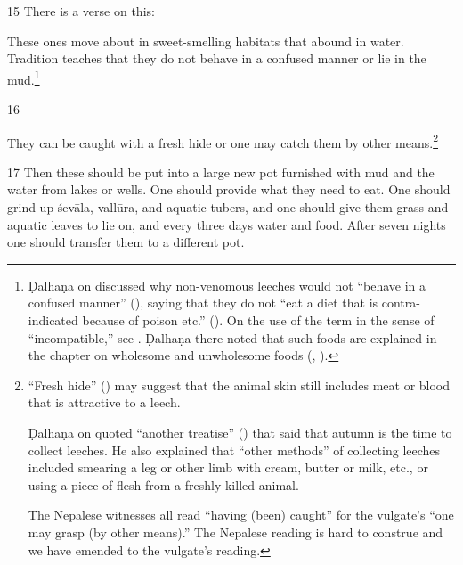 \begin{translation}
\item[15]
There is a verse on this:

\begin{sloka}
    These ones move about in sweet-smelling habitats that abound in water.
Tradition teaches that they do not behave in a confused manner or lie in the
mud.\footnote{Ḍalhaṇa on  discussed why non-venomous 
leeches
    would not “behave in a confused manner” (), saying that
    they do not “eat a diet that is contra-indicated because of poison etc.”
    ().  On the use of the term  in
    the sense of “incompatible,” see . Ḍalhaṇa there noted that
    such foods are explained in the chapter on wholesome and unwholesome 
    foods
    (, ).}
\end{sloka}

\item[16]

They can be caught with a fresh hide or one may catch them by other 
means.\footnote{“Fresh hide” () may suggest that the 
animal skin still 
includes
meat or blood that is attractive to a leech.

   Ḍalhaṇa on  quoted “another treatise”
() that said that autumn is the time to collect
leeches.  He also explained that “other methods” of collecting leeches
included smearing a leg or other limb with cream, butter or milk, etc.,
or using a piece of flesh from a freshly killed animal.

The Nepalese witnesses all read  “having (been)
caught” for the vulgate's  “one may grasp (by other means).” 
The Nepalese reading is hard to construe and we have emended to the 
vulgate's reading.}


\item [17] Then these should be put into a large new pot furnished with mud
and the water from lakes or wells. One should provide what they need to eat.
One should grind up \gls{śevāla}, \gls{vallūra}, and aquatic tubers, and one
should give them grass and aquatic leaves to lie on, and every three days
water and food.
%    
After seven nights one should transfer them to a different pot.


\end{translation}
